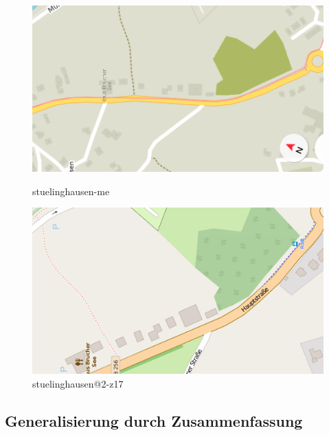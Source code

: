 \documentclass[../main/thesis.tex]{subfiles}
\begin{document}
\begin{figure}[ht]
  \begin{minipage}{.5\linewidth}
    \centering
    \includegraphics[width=\ScaleIfNeeded]{../chapter2/stuelinghausen-me}
    \caption{stuelinghausen-me}\label{fig:stuelinghausen-maps.me}
  \end{minipage}%
  \begin{minipage}{.5\linewidth}
    \centering
    \includegraphics[width=\ScaleIfNeeded]{../chapter2/stuelinghausen@2-z17}
    \caption{stuelinghausen@2-z17}\label{fig:stuelinghausen-mapnik}
  \end{minipage}
\end{figure}



\subsection{Generalisierung durch Zusammenfassung}

	
\end{document}
